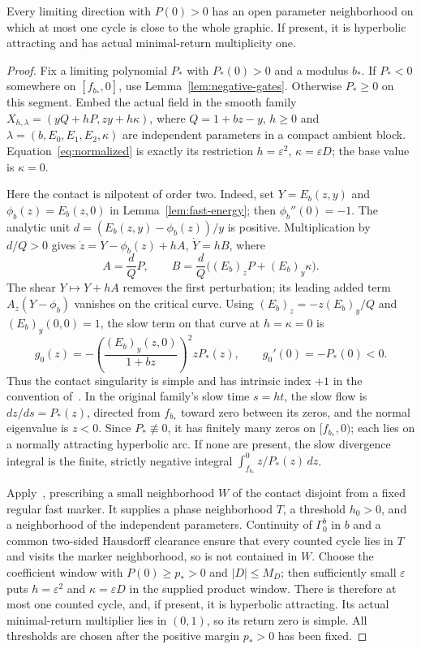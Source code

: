 \begin{proposition}\label{prop:positive-value}
Every limiting direction with $P(0)>0$ has an open parameter
neighborhood on which at most one cycle is close to the whole graphic.
If present, it is hyperbolic attracting and has actual minimal-return
multiplicity one.
\end{proposition}
\begin{proof}
Fix a limiting polynomial $P_*$ with $P_*(0)>0$ and a modulus $b_*$.
If $P_*<0$ somewhere on $[f_{b_*},0]$, use
Lemma~\ref{lem:negative-gates}. Otherwise $P_*\ge0$ on this segment.
Embed the actual field in the smooth family
$X_{h,\lambda}=(yQ+hP,zy+h\kappa)$, where $Q=1+bz-y$,
$h\ge0$ and $\lambda=(b,E_0,E_1,E_2,\kappa)$ are independent
parameters in a compact ambient block. Equation~\eqref{eq:normalized}
is exactly its restriction $h=\varepsilon^2$, $\kappa=\varepsilon D$;
the base value is $\kappa=0$.

Here the contact is nilpotent of order two. Indeed, set
$Y=E_b(z,y)$ and $\phi_b(z)=E_b(z,0)$ in
Lemma~\ref{lem:fast-energy}; then $\phi_b''(0)=-1$.
The analytic unit $d=(E_b(z,y)-\phi_b(z))/y$ is positive.
Multiplication by $d/Q>0$ gives
$\dot z=Y-\phi_b(z)+hA$, $\dot Y=hB$, where
\[
 A=\frac dQ P,\qquad
 B=\frac dQ\bigl((E_b)_zP+(E_b)_y\kappa\bigr).
\]
The shear $Y\mapsto Y+hA$ removes the first perturbation;
its leading added term $A_z(Y-\phi_b)$ vanishes on the critical curve.
Using $(E_b)_z=-z(E_b)_y/Q$ and $(E_b)_y(0,0)=1$, the slow term
on that curve at $h=\kappa=0$ is
\[
 g_0(z)=-\left(\frac{(E_b)_y(z,0)}{1+bz}\right)^2 zP_*(z),
 \qquad g_0'(0)=-P_*(0)<0.
\]
Thus the contact singularity is simple and has intrinsic index $+1$
in the convention of~\cite[pp.~175--178]{DMR2011Common}.
In the original family's slow time $s=ht$, the slow flow is
$dz/ds=P_*(z)$, directed from $f_{b_*}$ toward
zero between its zeros, and the normal eigenvalue is $z<0$.
Since $P_*\not\equiv0$, it has finitely many zeros on
$[f_{b_*},0)$; each lies on a normally attracting hyperbolic arc.
If none are present, the slow divergence integral is the finite,
strictly negative integral $\int_{f_{b_*}}^0 z/P_*(z)\,dz$.

Apply~\cite[Theorem~1, p.~173]{DMR2011Common}, prescribing a small
neighborhood $W$ of the contact disjoint from a fixed regular fast
marker. It supplies a phase neighborhood $T$, a threshold $h_0>0$,
and a neighborhood of the independent parameters. Continuity of
$\Gamma_0^b$ in $b$ and a common two-sided Hausdorff clearance ensure
that every counted cycle lies in $T$ and visits the marker neighborhood,
so is not contained in $W$. Choose the coefficient window with
$P(0)\ge p_*>0$ and $|D|\le M_D$; then sufficiently small
$\varepsilon$ puts $h=\varepsilon^2$ and $\kappa=\varepsilon D$
in the supplied product window. There is therefore at most one counted
cycle, and, if present, it is hyperbolic attracting. Its actual
minimal-return multiplier lies in $(0,1)$, so its return zero is simple.
All thresholds are chosen after the positive margin $p_*>0$ has been fixed.
\end{proof}

